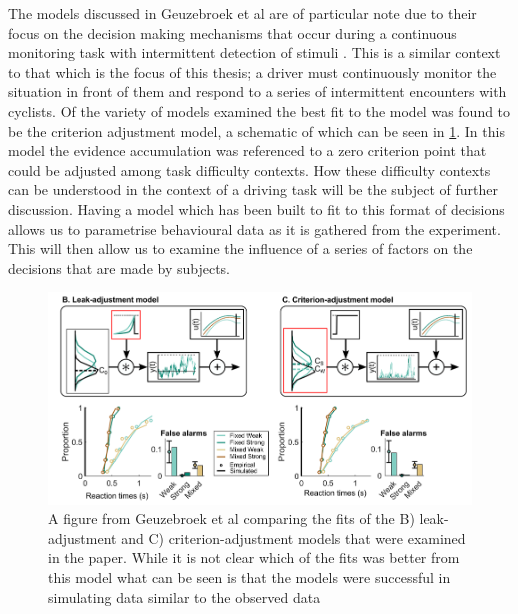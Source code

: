 The models discussed in Geuzebroek et al are of particular note due to their focus on the decision making mechanisms that occur during a continuous monitoring task with intermittent detection of stimuli \cite{geuzebroekBalancingTrueFalse2023}. This is a similar context to that which is the focus of this thesis; a driver must continuously monitor the situation in front of them and respond to a series of intermittent encounters with cyclists. Of the variety of models examined the best fit to the model was found to be the criterion adjustment model, a schematic of which can be seen in \ref{fig:Anna}. In this model the evidence accumulation was referenced to a zero criterion point that could be adjusted among task difficulty contexts. How these difficulty contexts can be understood in the context of a driving task will be the subject of further discussion.
Having a model which has been built to fit to this format of decisions allows us to parametrise behavioural data as it is gathered from the experiment. This will then allow us to examine the influence of a series of factors on the decisions that are made by subjects.
\begin{figure}
    \centering
    \includegraphics[width=0.75\linewidth]{figures/Anna.PNG}
    \caption{A figure from Geuzebroek et al comparing the fits of the B) leak-adjustment and C) criterion-adjustment models that were examined in the paper. While it is not clear which of the fits was better from this model what can be seen is that the models were successful in simulating data similar to the observed data \cite{geuzebroekBalancingTrueFalse2023}}
    \label{fig:Anna}
\end{figure}



